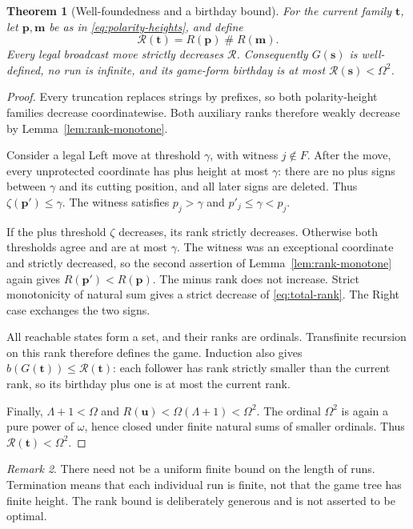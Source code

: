 \documentclass[11pt,letterpaper]{article}
\newtheorem{theorem}{Theorem}[section]
\theoremstyle{definition}
\theoremstyle{remark}
\newtheorem{remark}[theorem]{Remark}
\newcommand{\bs}{\boldsymbol{s}}
\newcommand{\bt}{\boldsymbol{t}}
\newcommand{\bu}{\boldsymbol{u}}
\newcommand{\ns}{\mathbin{\#}}
\newcommand{\Rk}{\mathcal R}
\begin{document}
\begin{theorem}[Well-foundedness and a birthday bound]\label{thm:rank}
For the current family $\bt$, let $\boldsymbol p,\boldsymbol m$ be as in
\eqref{eq:polarity-heights}, and define
\begin{equation}\label{eq:total-rank}
 \Rk(\bt)=R(\boldsymbol p)\ns R(\boldsymbol m).
\end{equation}
Every legal broadcast move strictly decreases $\Rk$. Consequently
$G(\bs)$ is well-defined, no run is infinite, and its game-form birthday is at
most $\Rk(\bs)<\Omega^2$.
\end{theorem}
\begin{proof}
Every truncation replaces strings by prefixes, so both polarity-height families
decrease coordinatewise. Both auxiliary ranks therefore weakly decrease by
Lemma~\ref{lem:rank-monotone}.

Consider a legal Left move at threshold $\gamma$, with witness $j\notin F$.
After the move, every unprotected coordinate has plus height at most $\gamma$:
there are no plus signs between $\gamma$ and its cutting position, and all later
signs are deleted. Thus $\zeta(\boldsymbol p')\leq\gamma$. The witness satisfies
$p_j>\gamma$ and $p'_j\leq\gamma<p_j$.

If the plus threshold $\zeta$ decreases, its rank strictly decreases. Otherwise
both thresholds agree and are at most $\gamma$. The witness was an exceptional
coordinate and strictly decreased, so the second assertion of
Lemma~\ref{lem:rank-monotone} again gives $R(\boldsymbol p')<R(\boldsymbol p)$.
The minus rank does not increase. Strict monotonicity of natural sum gives a
strict decrease of \eqref{eq:total-rank}. The Right case exchanges the two signs.

All reachable states form a set, and their ranks are ordinals. Transfinite
recursion on this rank therefore defines the game. Induction also gives
$b(G(\bt))\leq\Rk(\bt)$: each follower has rank strictly smaller than the current
rank, so its birthday plus one is at most the current rank.

Finally, $\Lambda+1<\Omega$ and
$R(\bu)<\Omega(\Lambda+1)<\Omega^2$. The ordinal $\Omega^2$ is again a pure power
of $\omega$, hence closed under finite natural sums of smaller ordinals. Thus
$\Rk(\bt)<\Omega^2$.
\end{proof}

\begin{remark}
There need not be a uniform finite bound on the length of runs. Termination
means that each individual run is finite, not that the game tree has finite
height. The rank bound is deliberately generous and is not asserted to be
optimal.
\end{remark}
\end{document}
